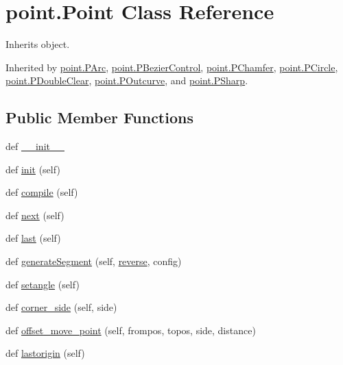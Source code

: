 \hypertarget{classpoint_1_1_point}{}\section{point.\+Point Class Reference}
\label{classpoint_1_1_point}


Inherits object.



Inherited by \hyperlink{classpoint_1_1_p_arc}{point.\+P\+Arc}, \hyperlink{classpoint_1_1_p_bezier_control}{point.\+P\+Bezier\+Control}, \hyperlink{classpoint_1_1_p_chamfer}{point.\+P\+Chamfer}, \hyperlink{classpoint_1_1_p_circle}{point.\+P\+Circle}, \hyperlink{classpoint_1_1_p_double_clear}{point.\+P\+Double\+Clear}, \hyperlink{classpoint_1_1_p_outcurve}{point.\+P\+Outcurve}, and \hyperlink{classpoint_1_1_p_sharp}{point.\+P\+Sharp}.

\subsection*{Public Member Functions}
\begin{DoxyCompactItemize}
\item 
def \hyperlink{classpoint_1_1_point_a4f2882f4c1d41b8ed0dcc040a56df10e}{\+\_\+\+\_\+init\+\_\+\+\_\+}
\item 
def \hyperlink{classpoint_1_1_point_aa4853372115d4266bed361f742de339e}{init} (self)
\item 
def \hyperlink{classpoint_1_1_point_aff32fe36a2cb7daed2d6b836e0a104c0}{compile} (self)
\item 
def \hyperlink{classpoint_1_1_point_a476d116396ab916e084cfa5951e270d6}{next} (self)
\item 
def \hyperlink{classpoint_1_1_point_a85952d3d8caf273ab39cf871157d0c2f}{last} (self)
\item 
def \hyperlink{classpoint_1_1_point_a3beb8e8b3f86d4a72b1e8216b274740a}{generate\+Segment} (self, \hyperlink{classpoint_1_1_point_a999ffad9951028b7456cea0afb407e48}{reverse}, config)
\item 
def \hyperlink{classpoint_1_1_point_a11f285bd3b03aa083a25ec1861e3fa16}{setangle} (self)
\item 
def \hyperlink{classpoint_1_1_point_a4a3ad4c500effc3b0a67868957108fb0}{corner\+\_\+side} (self, side)
\item 
def \hyperlink{classpoint_1_1_point_a77d736f755797d41a2fd87f92b17e015}{offset\+\_\+move\+\_\+point} (self, frompos, topos, side, distance)
\item 
def \hyperlink{classpoint_1_1_point_a27c3c9e7cafb48996d77e65cfe04df05}{lastorigin} (self)
\end{DoxyCompactItemize}
